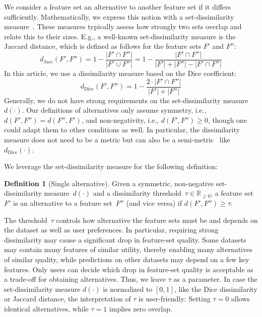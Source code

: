 \documentclass{article}
\theoremstyle{definition}
\newtheorem{definition}{Definition}
\begin{document}
We consider a feature set an alternative to another feature set if it differs sufficiently.
Mathematically, we express this notion with a set-dissimilarity measure~\cite{choi2010survey, egghe2009new}.
These measures typically assess how strongly two sets overlap and relate this to their sizes.
E.g., a well-known set-dissimilarity measure is the Jaccard distance, which is defined as follows for the feature sets $F'$ and $F''$:
%
\begin{equation}
	d_{\text{Jacc}}(F',F'') = 1 - \frac{|F' \cap F''|}{|F' \cup F''|} = 1 - \frac{|F' \cap F''|}{|F'| + |F''| - |F' \cap F''|}
	\label{eq:afs:jaccard}
\end{equation}
%
In this article, we use a dissimilarity measure based on the Dice coefficient:
%
\begin{equation}
	d_{\text{Dice}}(F',F'') = 1 - \frac{2 \cdot |F' \cap F''|}{|F'| + |F''|}
	\label{eq:afs:dice}
\end{equation}
%
Generally, we do not have strong requirements on the set-dissimilarity measure~$d(\cdot)$.
Our definitions of alternatives only assume symmetry, i.e., $d(F',F'')=d(F'',F')$, and non-negativity, i.e., $d(F',F'') \geq 0$, though one could adapt them to other conditions as well.
In particular, the dissimilarity measure does not need to be a metric but can also be a semi-metric~\cite{wilson1931semi} like~$d_{\text{Dice}}(\cdot)$.

We leverage the set-dissimilarity measure for the following definition:
%
\begin{definition}[Single alternative]
	Given a symmetric, non-negative set-dissimi\-larity measure~$d(\cdot)$ and a dissimilarity threshold~$\tau \in \mathbb{R}_{\geq 0}$, a feature set $F'$ is an alternative to a feature set~$F''$ (and vice versa) if $d(F',F'') \geq \tau$.
	\label{def:afs:single-alternative}
\end{definition}
%
The threshold~$\tau$ controls how alternative the feature sets must be and depends on the dataset as well as user preferences.
In particular, requiring strong dissimilarity may cause a significant drop in feature-set quality.
Some datasets may contain many features of similar utility, thereby enabling many alternatives of similar quality, while predictions on other datasets may depend on a few key features.
Only users can decide which drop in feature-set quality is acceptable as a trade-off for obtaining alternatives.
Thus, we leave $\tau$ as a parameter.
In case the set-dissimilarity measure $d(\cdot)$ is normalized to $[0,1]$, like the Dice dissimilarity or Jaccard distance, the interpretation of $\tau$ is user-friendly:
Setting $\tau=0$ allows identical alternatives, while $\tau=1$ implies zero overlap.
\end{document}
